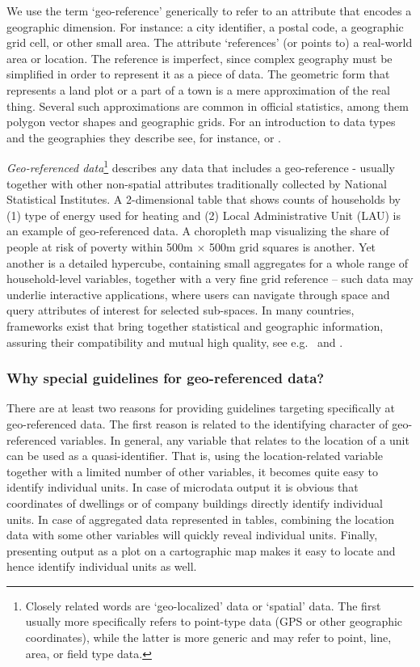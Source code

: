 We use the term `geo-reference' generically to refer to an attribute that encodes a geographic dimension. For instance: a city identifier, a postal code, a geographic grid cell, or other small area. The attribute `references' (or points to) a real-world area or location. The reference is imperfect, since complex geography must be simplified in order to represent it as a piece of data. The geometric form that represents a land plot or a part of a town is a mere approximation of the real thing. Several such approximations are common in official statistics, among them polygon vector shapes and geographic grids. For an introduction to data types and the geographies they describe see, for instance, \cite{Haining2010} or \cite{AudricEtAl2018}.

\emph{Geo-referenced data}\footnote{
    Closely related words are `geo-localized' data or `spatial' data. The first usually more specifically refers to point-type data (GPS or other geographic coordinates), while the latter is more generic and may refer to point, line, area, or field type data.} 
describes any data that includes a geo-reference - usually together with other non-spatial attributes traditionally collected by National Statistical Institutes. A 2-dimensional table that shows counts of households by (1) type of energy used for heating and (2) Local Administrative Unit (LAU) is an example of geo-referenced data. A choropleth map visualizing the share of people at risk of poverty within 500m $\times$ 500m grid squares is another. Yet another is a detailed hypercube, containing small aggregates for a whole range of household-level variables, together with a very fine grid reference -- such data may underlie interactive applications, where users can navigate through space and query attributes of interest for selected sub-spaces.
In many countries, frameworks exist that bring together statistical and geographic information, assuring their compatibility and mutual high quality, see e.g.\ \cite{HaldorsonMostrom2019} and \cite{VanHalderenEtAl2016}.

\subsubsection{Why special guidelines for geo-referenced data?}
There are at least two reasons for providing guidelines targeting specifically at geo-referenced data. The first reason is related to the identifying character of geo-referenced variables. In general, any variable that relates to the location of a unit can be used as a quasi-identifier. That is, using the location-related variable together with a limited number of other variables, it becomes quite easy to identify individual units. In case of microdata output it is obvious that coordinates of dwellings or of company buildings directly identify individual units. In case of aggregated data represented in tables, combining the location data with some other variables will quickly reveal individual units. Finally, presenting output as a plot on a cartographic map makes it easy to locate and hence identify individual units as well.

